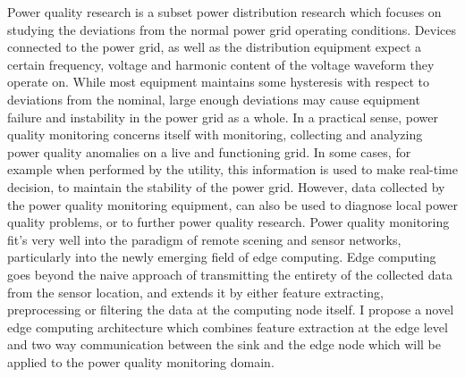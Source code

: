 Power quality research is a subset power distribution research which focuses on studying the deviations from the normal power grid operating conditions. Devices connected to the power grid, as well as the distribution equipment expect a certain frequency, voltage and harmonic content of the voltage waveform they operate on. While most equipment maintains some hysteresis with respect to deviations from the nominal, large enough deviations may cause equipment failure and instability in the power grid as a whole. In a practical sense, power quality monitoring concerns itself with monitoring, collecting and analyzing power quality anomalies on a live and functioning grid. In some cases, for example when performed by the utility, this information is used to make real-time decision, to maintain the stability of the power grid. However, data collected by the power quality monitoring equipment, can also be used to diagnose local power quality problems, or to further power quality research. Power quality monitoring fit's very well into the paradigm of remote scening and sensor networks, particularly into the newly emerging field of edge computing. Edge computing goes beyond the naive approach of transmitting the entirety of the collected data from the sensor location, and extends it by either feature extracting, preprocessing or filtering the data at the computing node itself. I propose a novel edge computing architecture which combines feature extraction at the edge level and two way communication between the sink and the edge node which will be applied to the power quality monitoring domain.
